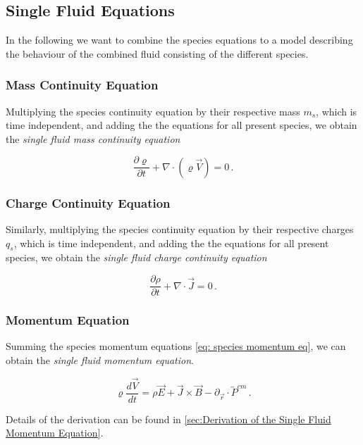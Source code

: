 \subsection{Single Fluid Equations}

In the following we want to combine the species equations to a model describing the behaviour of the combined fluid consisting of the different species.

\subsubsection{Mass Continuity Equation}
Multiplying the species continuity equation by their respective mass $m_s$, which is time independent, and adding the the equations for all present species, we obtain the \emph{single fluid mass continuity equation}

\begin{equation*}
    \frac{\partial \varrho}{\partial t} + \nabla \cdot (\varrho \vec{V}) = 0  \, .
\end{equation*}


\subsubsection{Charge Continuity Equation}
Similarly, multiplying the species continuity equation by their respective charges $q_s$, which is time independent, and adding the the equations for all present species, we obtain the \emph{single fluid charge continuity equation}

\begin{equation*}
    \frac{\partial \rho}{\partial t} + \nabla \cdot  \vec{J} = 0  \, .
\end{equation*} 

\subsubsection{Momentum Equation}

Summing the species momentum equations \eqref{eq: species momentum eq}, we can obtain the \emph{single fluid momentum equation}.

\begin{equation}\label{eq: Single fluid momentum eq.}
    \varrho \frac{d\vec{V}}{dt} = \rho \vec{E} + \vec{J} \times \vec{B} - \partial_{\vec{r}} \cdot \overleftrightarrow{P}^{cm}  \, .
\end{equation}

Details of the derivation can be found in \ref{sec:Derivation of the Single Fluid Momentum Equation}.



